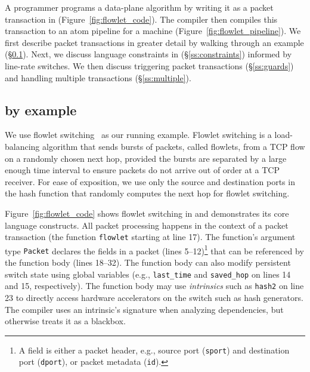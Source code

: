 A programmer programs a data-plane algorithm by writing it as
a packet transaction in \pktlanguage (Figure~\ref{fig:flowlet_code}).  The
\pktlanguage compiler then compiles this transaction to an atom pipeline for a
\absmachine machine (Figure~\ref{fig:flowlet_pipeline}). We first describe
packet transactions in greater detail by walking through an example
(\S\ref{ss:flowlet}). Next, we discuss language constraints in \pktlanguage
(\S\ref{ss:constraints}) informed by line-rate switches.  We then discuss
triggering packet transactions (\S\ref{ss:guards}) and handling multiple
transactions (\S\ref{ss:multiple}).

\subsection{\pktlanguage by example}
\label{ss:flowlet}

We use flowlet switching~\cite{flowlets} as our running example. Flowlet
switching is a load-balancing algorithm that sends bursts of packets, called
flowlets, from a TCP flow on a randomly chosen next hop, provided the bursts
are separated by a large enough time interval to ensure packets do not arrive
out of order at a TCP receiver. For ease of exposition, we use only the source
and destination ports in the hash function that randomly computes the next hop
for flowlet switching.

Figure~\ref{fig:flowlet_code} shows flowlet switching in \pktlanguage and
demonstrates its core language constructs. All packet processing happens in the
context of a packet transaction (the function \texttt{flowlet} starting at line
17). The function's argument type {\tt Packet} declares the fields in a packet
(lines 5--12)\footnote{A field is either a packet header, e.g.,
source port ({\tt sport}) and destination port ({\tt dport}), or packet
metadata ({\tt id}).} that can be referenced by the function body (lines
18--32).  The function body can also modify persistent switch state using
global variables (e.g., \texttt{last\_time} and \texttt{saved\_hop} on lines 14
and 15, respectively). The function body may use \textit{intrinsics} such as
\texttt{hash2} on line 23 to directly access hardware accelerators on the
switch such as hash generators.  The \pktlanguage compiler uses an intrinsic's
signature when analyzing dependencies, but otherwise treats it as a blackbox.


